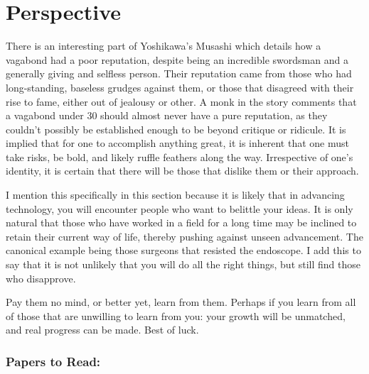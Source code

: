 \documentclass[12pt]{report}
\begin{document}
\section{Perspective}
There is an interesting part of Yoshikawa's Musashi which details how a vagabond had a poor reputation, despite being an incredible swordsman and a generally giving and selfless person. Their reputation came from those who had long-standing, baseless grudges against them, or those that disagreed with their rise to fame, either out of jealousy or other. A monk in the story comments that a vagabond under 30 should almost never have a pure reputation, as they couldn't possibly be established enough to be beyond critique or ridicule. It is implied that for one to accomplish anything great, it is inherent that one must take risks, be bold, and likely ruffle feathers along the way. Irrespective of one's identity, it is certain that there will be those that dislike them or their approach.\newline

I mention this specifically in this section because it is likely that in advancing technology, you will encounter people who want to belittle your ideas. It is only natural that those who have worked in a field for a long time may be inclined to retain their current way of life, thereby pushing against unseen advancement. The canonical example being those surgeons that resisted the endoscope. I add this to say that it is not unlikely that you will do all the right things, but still find those who disapprove.\newline

Pay them no mind, or better yet, learn from them. Perhaps if you learn from all of those that are unwilling to learn from you: your growth will be unmatched, and real progress can be made. Best of luck. 

\subsubsection{Papers to Read:}
\end{document}
